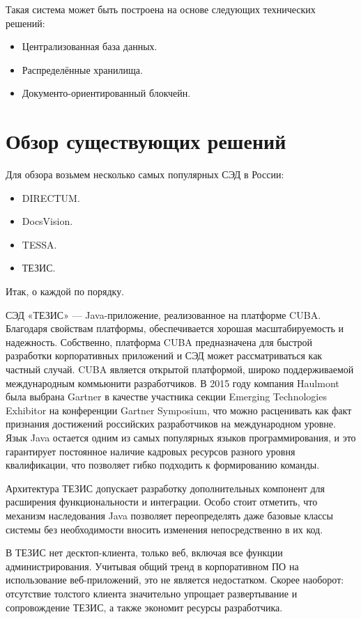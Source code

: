 Такая система может быть построена на основе следующих технических решений:
\begin{itemize}
	\item Централизованная база данных.
	\item Распределённые хранилища.
	\item Документо-ориентированный блокчейн.
\end{itemize}
\section{Обзор существующих решений} \label{subsec:ch1/sec2}
Для обзора возьмем несколько самых популярных СЭД в России:
\begin{itemize}
	\item DIRECTUM.
	\item DocsVision.
	\item TESSA.
	\item ТЕЗИС.
\end{itemize}
Итак, о каждой по порядку.

СЭД «ТЕЗИС» — Java-приложение, реализованное на платформе CUBA. Благодаря свойствам платформы, обеспечивается хорошая масштабируемость и надежность. Собственно, платформа CUBA предназначена для быстрой разработки корпоративных приложений и СЭД может рассматриваться как частный случай. CUBA является открытой платформой, широко поддерживаемой международным коммьюнити разработчиков. В 2015 году компания Haulmont была выбрана Gartner в качестве участника секции Emerging Technologies Exhibitor на конференции Gartner Symposium, что можно расценивать как факт признания достижений российских разработчиков на международном уровне. Язык Java остается одним из самых популярных языков программирования, и это гарантирует постоянное наличие кадровых ресурсов разного уровня квалификации, что позволяет гибко подходить к формированию команды.

Архитектура ТЕЗИС допускает разработку дополнительных компонент для расширения функциональности и интеграции. Особо стоит отметить, что механизм наследования Java позволяет переопределять даже базовые классы системы без необходимости вносить изменения непосредственно в их код.

В ТЕЗИС нет десктоп-клиента, только веб, включая все функции администрирования. Учитывая общий тренд в корпоративном ПО на использование веб-приложений, это не является недостатком. Скорее наоборот: отсутствие толстого клиента значительно упрощает развертывание и сопровождение ТЕЗИС, а также экономит ресурсы разработчика.

